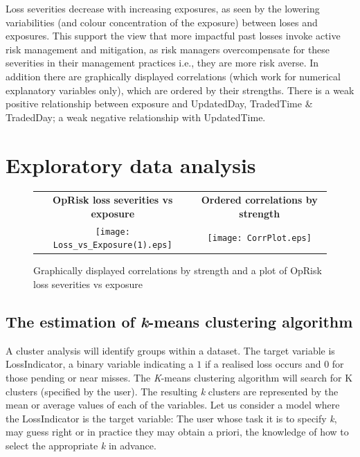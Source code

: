 \documentclass{DissertateUSU}
\begin{document}
Loss severities decrease with increasing exposures, as seen by the
lowering variabilities (and colour concentration of the exposure)
between loses and exposures. This support the view that more impactful
past losses invoke active risk management and mitigation, as risk
managers overcompensate for these severities in their management
practices i.e., they are more risk averse. In addition there are
graphically displayed correlations (which work for numerical explanatory
variables only), which are ordered by their strengths. There is a weak
positive relationship between exposure and UpdatedDay, TradedTime \&
TradedDay; a weak negative relationship with UpdatedTime.

\section{Exploratory data analysis}

\begin{figure}
\begin{frame}
      \centering
       \begin{tabular}{cc}
        \textbf{OpRisk loss severities vs exposure} & \textbf{Ordered correlations by strength}\\
        \texttt{[image: Loss\_vs\_Exposure(1).eps]}
         &
         \texttt{[image: CorrPlot.eps]}
         \end{tabular}
    \end{frame}
    \caption{Graphically displayed correlations by strength and a plot of OpRisk loss severities vs exposure}
    \label{Fig4}
\end{figure}

\subsection{The estimation of \emph{k}-means clustering algorithm}

A cluster analysis will identify groups within a dataset. The target
variable is LossIndicator, a binary variable indicating a \(1\) if a
realised loss occurs and \(0\) for those pending or near misses. The
\emph{K}-means clustering algorithm will search for K clusters
(specified by the user). The resulting \emph{k} clusters are represented
by the mean or average values of each of the variables. Let us consider
a model where the LossIndicator is the target variable: The user whose
task it is to specify \emph{k}, may guess right or in practice they may
obtain a priori, the knowledge of how to select the appropriate \emph{k}
in advance.\medskip
\end{document}
